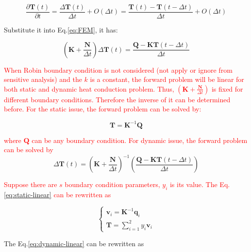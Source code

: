 \documentclass[review]{elsarticle}
\begin{document}
\begin{equation}
    \frac{\partial \mathbf{T}(t)}{\partial t} = \frac{\Delta \mathbf{T}(t)}{\Delta t} + O(\Delta t) = \frac{\mathbf{T}(t)-\mathbf{T}(t-\Delta t)}{\Delta t} + O(\Delta t) 
    \label{eq:BD}
\end{equation}

Substitute it into Eq.\ref{eq:FEM}, it has:

\begin{equation}
    (\mathbf{K} + \frac{\mathbf{N}}{\Delta t})\Delta \mathbf{T}(t) = \frac{\mathbf{Q}-\mathbf{K}\mathbf{T}(t-\Delta t)}{\Delta t}
    \label{eq:BD-FEM}
\end{equation}

\textcolor{red}{When Robin boundary condition is not considered (not apply or ignore from sensitive analysis) and the  $k$ is a constant, the forward problem will be linear for both static and dynamic heat conduction problem. Thus, $\left(\mathbf{K}+\frac{\mathbf{N}}{\Delta t}\right)$ is fixed for different boundary conditions. Therefore the inverse of it can be determined before. For the static issue, the forward problem can be solved by:}

\begin{equation}
    \mathbf{T} = \mathbf{K}^{-1}\mathbf{Q}
    \label{eq:static-linear}
\end{equation}

\noindent \textcolor{red}{where $\mathbf{Q}$ can be any boundary condition. For dynamic issue, the forward problem can be solved by}
\begin{equation}
    \Delta \mathbf{T}(t) = \left( \mathbf{K}+\frac{\mathbf{N}}{\Delta t}\right)^{-1} \left(\frac{\mathbf{Q}-\mathbf{K}\mathbf{T}(t-\Delta t)}{\Delta t}\right)
    \label{eq:dynamic-linear}
\end{equation}

\textcolor{red}{Suppose there are $s$ boundary condition parameters, $y_i$ is its value. The Eq.\ref{eq:static-linear} can be rewritten as}

\begin{equation}
    \left\{\begin{array}{lr}
    \mathbf{v}_i = \mathbf{K}^{-1}\mathbf{q}_i\\
    \mathbf{T} = \sum_{i=1}^2 y_i\mathbf{v}_i
  \end{array}
\right.
\end{equation}

The Eq.\ref{eq:dynamic-linear} can be rewritten as
\end{document}
